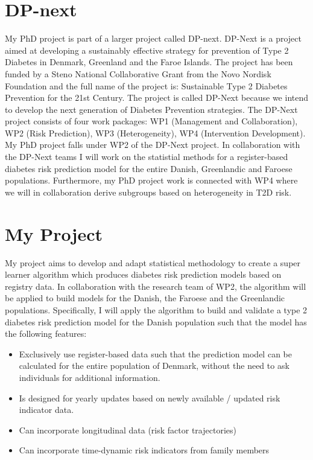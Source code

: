 \documentclass{article}
\author{Hjalte Søberg Mikkelsen}
\affil{Steno Diabetes Center Copenhagen}
\date{}
\title{}
\begin{document}
\newpage
\section*{DP-next}
\label{sec:org60bc718}

My PhD project is part of a larger project called DP-next. DP-Next is
a project aimed at developing a sustainably effective strategy for
prevention of Type 2 Diabetes in Denmark, Greenland and the Faroe
Islands. The project has been funded by a Steno National Collaborative
Grant from the Novo Nordisk Foundation and the full name of the
project is: Sustainable Type 2 Diabetes Prevention for the 21st
Century. The project is called DP-Next because we intend to develop
the next generation of Diabetes Prevention strategies. The DP-Next
project consists of four work packages: WP1 (Management and
Collaboration), WP2 (Risk Prediction), WP3 (Heterogeneity), WP4
(Intervention Development). My PhD project falls under WP2 of the
DP-Next project. In collaboration with the DP-Next teams I will work
on the statistial methods for a register-based diabetes risk
prediction model for the entire Danish, Greenlandic and Faroese
populations. Furthermore, my PhD project work is connected with WP4
where we will in collaboration derive subgroups based on heterogeneity
in T2D risk.

\section*{My Project}
\label{sec:orgebaf3c9}

My project aims to develop and adapt statistical methodology to create
a super learner algorithm which produces diabetes risk prediction
models based on registry data. In collaboration with the research team
of WP2, the algorithm will be applied to build models for the Danish,
the Faroese and the Greenlandic populations. Specifically, I will
apply the algorithm to build and validate a type 2 diabetes risk prediction
model for the Danish population such that the model has the following
features:

\begin{itemize}
\item Exclusively use register-based data such that the prediction model
can be calculated for the entire population of Denmark, without the
need to ask individuals for additional information.
\item Is designed for yearly updates based on newly available / updated
risk indicator data.
\item Can incorporate longitudinal data (risk factor trajectories)
\item Can incorporate time-dynamic risk indicators from family members
\end{itemize}
\end{document}
